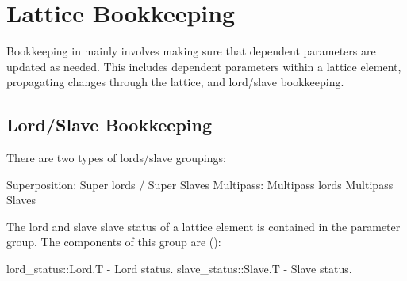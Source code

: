 \chapter{Lattice Bookkeeping}
\label{c:bookkeeping}

Bookkeeping in \accellat mainly involves making sure that dependent parameters are updated as needed.
This includes dependent parameters within a lattice element, propagating changes through the lattice,
and lord/slave bookkeeping.

\section{Lord/Slave Bookkeeping}
\label{s:lord.slave.book}

There are two types of lords/slave groupings:
\begin{example}
  Superposition: Super lords / Super Slaves        
  Multipass:     Multipass lords Multipass Slaves  
\end{example}

The lord and slave slave status of a lattice element is contained in the 
parameter group. The components of this group are ():
\begin{example}
  lord_status::Lord.T     - Lord status. 
  slave_status::Slave.T   - Slave status. 
\end{example}

